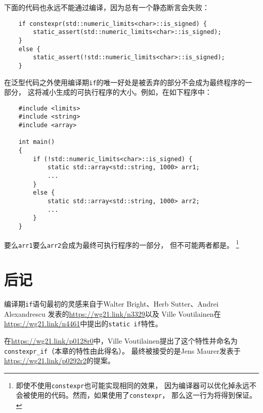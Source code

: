 下面的代码也永远不能通过编译，因为总有一个静态断言会失败：
\begin{lstlisting}
    if constexpr(std::numeric_limits<char>::is_signed) {
        static_assert(std::numeric_limits<char>::is_signed);
    }
    else {
        static_assert(!std::numeric_limits<char>::is_signed);
    }
\end{lstlisting}
在泛型代码之外使用编译期\texttt{if}的唯一好处是被丢弃的部分不会成为最终程序的一部分，
这将减小生成的可执行程序的大小。例如，在如下程序中：
\begin{lstlisting}
    #include <limits>
    #include <string>
    #include <array>

    int main()
    {
        if (!std::numeric_limits<char>::is_signed) {
            static std::array<std::string, 1000> arr1;
            ...
        }
        else {
            static std::array<std::string, 1000> arr2;
            ...
        }
    }
\end{lstlisting}
要么\texttt{arr1}要么\texttt{arr2}会成为最终可执行程序的一部分，
但不可能两者都是。
\footnote{即使不使用\texttt{constexpr}也可能实现相同的效果，
因为编译器可以优化掉永远不会被使用的代码。然而，如果使用了\texttt{constexpr}，
那么这一行为将得到保证。}

\section{后记}
编译期\texttt{if}语句最初的灵感来自于Walter Bright、Herb Sutter、Andrei Alexandrescu
发表的\url{https://wg21.link/n3329}以及
Ville Voutilainen在\url{https://wg21.link/n4461}中提出的\texttt{static if}特性。

在\url{https://wg21.link/p0128r0}中，Ville Voutilainen提出了这个特性并命名为
\texttt{constexpr\_if}（本章的特性由此得名）。
最终被接受的是Jens Maurer发表于\url{https://wg21.link/p0292r2}的提案。